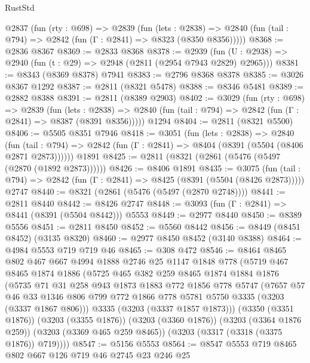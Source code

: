 \begin{lexlean}{RustStd}
\begin{coremodule}
  @2837
    (fun (rty : @698) =>
    @2839
      (fun (lets : @2838) =>
      @2840 (fun (tail : @794) => @2842 (fun (Γ : @2841) => @8323 (@8350 @8356)))))
@8368 := @2836 @8367
@8369 := @2833 @8368
@8378 := @2939 (fun (U : @2938) => @2940 (fun (t : @29) => @2948 (@2811 (@2954 @7943 @2829) @2965)))
@8381 := @8343 (@8369 @8378) @7941
@8383 := @2796 @8368 @8378
@8385 := @3026 @8367 @1292
@8387 := @2811 (@8321 @5478)
@8388 := @8346 @5481
@8389 := @2882 @8388
@8391 := @2811 (@8389 @2903)
@8402 := @3029
    (fun (rty : @698) =>
    @2839
      (fun (lets : @2838) =>
      @2840 (fun (tail : @794) => @2842 (fun (Γ : @2841) => @8387 (@8391 @8356)))))
    @1294
@8404 := @2811 (@8321 @5500)
@8406 := @5505 @8351 @7946
@8418 := @3051
    (fun (lets : @2838) =>
    @2840
      (fun (tail : @794) => @2842 (fun (Γ : @2841) => @8404 (@8391 (@5504 (@8406 @2871 @2873))))))
    @1891
@8425 := @2811 (@8321 (@2861 (@5476 (@5497 (@2870 (@1892 @2873))))))
@8426 := @8406 @1891
@8435 := @3075
    (fun (tail : @794) => @2842 (fun (Γ : @2841) => @8425 (@8391 (@5504 (@8426 @2873)))))
    @2747
@8440 := @8321 (@2861 (@5476 (@5497 (@2870 @2748))))
@8441 := @2811 @8440
@8442 := @8426 @2747
@8448 := @3093 (fun (Γ : @2841) => @8441 (@8391 (@5504 @8442))) @5553
@8449 := @2977 @8440
@8450 := @8389 @5556
@8451 := @2811 @8450
@8452 := @5560 @8442
@8456 := @8449 (@8451 @8452) (@3135 @8320)
@8460 := @2977 @8450 @8452 (@3140 @8388)
@8464 := @4984 @5553 @719 @719 @46
@8465 := @308 @472
@8546 := @8464
    @8465
    @802
    @467
    @667
    @4994
    @1888
    @2746
    @25
    @1147
    @1848
    @778
    (@5719
      @467
      @8465
      @1874
      @1886
      (@5725
        @465
        @382
        @259
        @8465
        @1874
        @1884
        @1876
        (@5735
          @71
          @31
          @258
          @943
          @1873
          @1883
          @772
          @1856
          @778
          @5747
          (@7657
            @57
            @46
            @33
            @1346
            @806
            @799
            @772
            @1866
            @778
            @5781
            @5750
            @3335
            (@3203 (@3337 @1867 @806)))
          @3335
          (@3203 (@3337 @1857 @1873)))
        (@3350 (@3351 @1876))
        (@3203 (@3355 @1876))
        (@3203 (@3360 @1876))
        (@3203 (@3364 @1876 @259))
        (@3203 (@3369 @465 @259 @8465))
        (@3203 (@3317 (@3318 (@3375 @1876)) @719))))
@8547 := @5156 @5553
@8564 := @8547
    @5553
    @719
    @8465
    @802
    @667
    @126
    @719
    @46
    @2745
    @23
    @246
    @25

\end{coremodule}
\end{lexlean}
